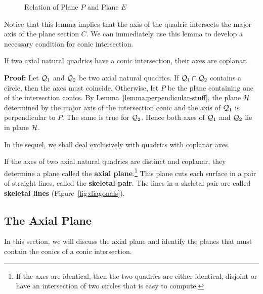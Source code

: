 \begin{figure}
\vspace{7.5cm}
\caption{Relation of Plane $P$ and Plane $E$}
\label{fig:perpendicular}
\end{figure}

Notice that this lemma implies that the axis of the quadric
intersects the major axis of the plane section $C$.
We can immediately use this lemma to develop a necessary condition for
conic intersection.

\begin{lemma}
\label{lemma:non-skew}
     If two axial natural quadrics have a conic intersection, their
axes are coplanar.
\end{lemma}
{\bf Proof:}  Let ${\cal Q}_1$ and ${\cal Q}_2$ be two axial natural quadrics.
If ${\cal Q}_1\cap{\cal Q}_2$ contains a circle, then the axes must coincide.
Otherwise, let $P$ be the plane containing one of the intersection conics.
By Lemma~\ref{lemma:perpendicular-stuff}, the plane ${\cal H}$ determined by
the major axis of the intersection conic and the axis of ${\cal Q}_1$ is
perpendicular to $P$.  The same is true for ${\cal Q}_2$.  Hence both axes of
${\cal Q}_1$ and ${\cal Q}_2$ lie in plane ${\cal H}$.  \QED

In the sequel, we shall deal exclusively with quadrics with coplanar axes.

\begin{definition}
     If the axes of two axial natural quadrics are distinct and coplanar,
they determine a plane called the {\bf axial plane}.\footnote{If the axes are
identical, then the two quadrics are either identical, disjoint or have an
intersection of two circles that is easy to compute.}  This plane cuts each
surface in a pair of straight lines, called the  {\bf skeletal pair}.
The lines in a skeletal pair are called {\bf skeletal lines}
(Figure~\ref{fig:diagonals}).
\end{definition}





\subsection{The Axial Plane}
\label{section:axial-plane}

     In this section, we will discuss the axial plane and identify the planes
that must contain the conics of a conic intersection.

